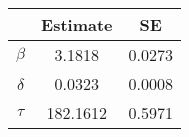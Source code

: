 


		\begin{tabular}{ccc}
		& {\bf{Estimate}} & {\bf{SE}}  \\
		\hline
		{\bf{$\beta$}} &	3.1818		& 0.0273		\\
		{\bf{$\delta$}} &	0.0323		& 0.0008		 \\
		{\bf{$\tau$}}	&	182.1612	& 0.5971		 \\
		\end{tabular}


			